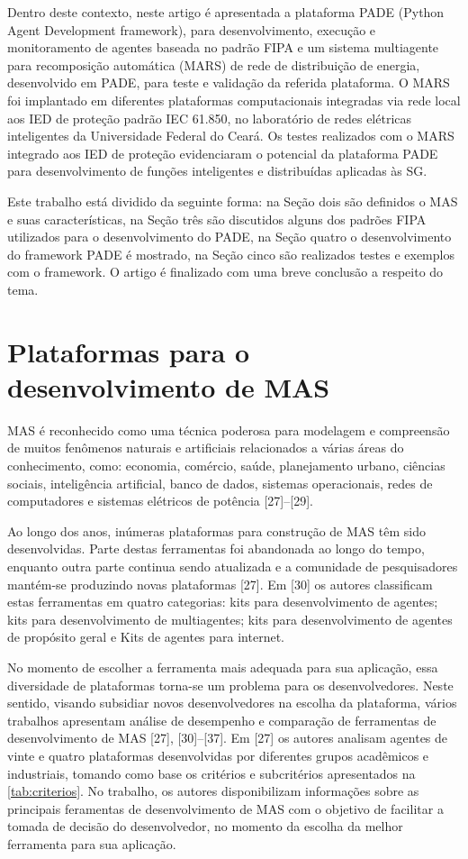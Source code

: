 \documentclass[journal]{IEEEtran}
\begin{document}
Dentro deste contexto, neste artigo é apresentada a plataforma PADE (Python Agent Development framework), para desenvolvimento, execução e monitoramento de agentes baseada no padrão FIPA e um sistema multiagente para recomposição automática (MARS) de rede de distribuição de energia, desenvolvido em PADE, para teste e validação da referida plataforma. O MARS foi implantado em diferentes plataformas computacionais integradas via rede local aos IED de proteção padrão IEC 61.850, no laboratório de redes elétricas inteligentes da Universidade Federal do Ceará. Os testes realizados com o MARS integrado aos IED de proteção evidenciaram o potencial da plataforma PADE para desenvolvimento de funções inteligentes e distribuídas aplicadas às SG.

Este trabalho está dividido da seguinte forma: na Seção dois são definidos o MAS e suas características, na Seção três são discutidos alguns dos padrões FIPA utilizados para o desenvolvimento do PADE, na Seção quatro o desenvolvimento do framework PADE é mostrado, na Seção cinco são realizados testes e exemplos com o framework. O artigo é finalizado com uma breve conclusão a respeito do tema.

\section{Plataformas para o desenvolvimento de MAS}

MAS é reconhecido como uma técnica poderosa para modelagem e compreensão de muitos fenômenos naturais e artificiais relacionados a várias áreas do conhecimento, como: economia, comércio, saúde, planejamento urbano, ciências sociais, inteligência artificial, banco de dados, sistemas operacionais, redes de computadores e sistemas elétricos de potência [27]–[29].

Ao longo dos anos, inúmeras plataformas para construção de MAS têm sido desenvolvidas. Parte destas ferramentas foi abandonada ao longo do tempo, enquanto outra parte continua sendo atualizada e a comunidade de pesquisadores mantém-se produzindo novas plataformas [27]. Em [30] os autores classificam estas ferramentas em quatro categorias: kits para desenvolvimento de agentes; kits para desenvolvimento de multiagentes; kits para desenvolvimento de agentes de propósito geral e Kits de agentes para internet. 

No momento de escolher a ferramenta mais adequada para sua aplicação, essa diversidade de plataformas torna-se um problema para os desenvolvedores. Neste sentido, visando subsidiar novos desenvolvedores na escolha da plataforma, vários trabalhos apresentam análise de desempenho e comparação de ferramentas de desenvolvimento de MAS [27], [30]–[37]. Em [27] os autores analisam agentes de vinte e quatro plataformas desenvolvidas por diferentes grupos acadêmicos e industriais, tomando como base os critérios e subcritérios apresentados na \autoref{tab:criterios}. No trabalho, os autores disponibilizam informações sobre as principais feramentas de desenvolvimento de MAS com o objetivo de facilitar a tomada de decisão do desenvolvedor, no momento da escolha da melhor ferramenta para sua aplicação.
\end{document}
